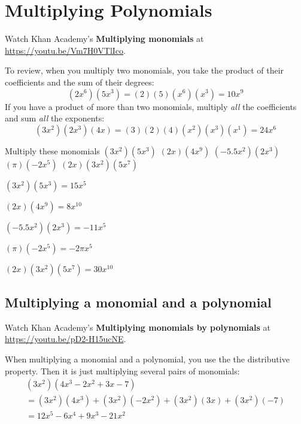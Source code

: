 \chapter{Multiplying Polynomials}

Watch Khan Academy's \textbf{Multiplying monomials} at \url{https://youtu.be/Vm7H0VTlIco}.

To review, when you multiply two monomials, you take the product of
their coefficients and the sum of their degrees:
\begin{equation*}
  (2x^6)(5x^3) = (2)(5)(x^6)(x^3) = 10x^9
\end{equation*}
If you have a product of more than two monomials, multiply \emph{all}
the coefficients and sum \emph{all} the exponents:
\begin{equation*}
  (3x^2)(2x^3)(4x) = (3)(2)(4)(x^2)(x^3)(x^1) = 24x^6
\end{equation*}

\begin{Exercise}[title={Multiplying monomials}, label=multmonomials]
Multiply these monomials
  \Question $(3x^2)(5x^3)$
\vspace{20mm}
  \Question $(2x)(4x^9)$
\vspace{20mm}
  \Question $(-5.5x^2)(2x^3)$
\vspace{20mm}
  \Question $(\pi)(-2x^5)$
\vspace{20mm}
  \Question $(2x)(3x^2)(5x^7)$
\vspace{20mm}
\end{Exercise}
\begin{Answer}[ref=multmonomials]
  $(3x^2)(5x^3) = 15x^5$
  
  $(2x)(4x^9) = 8x^{10}$
  
  $(-5.5x^2)(2x^3) = -11x^5$

  $(\pi)(-2x^5) = -2\pi x^5$
  
  $(2x)(3x^2)(5x^7) = 30x^{10}$
\end{Answer}

\section{Multiplying a monomial and a polynomial}

Watch Khan Academy's \textbf{Multiplying monomials by polynomials} at \url{https://youtu.be/pD2-H15ucNE}.

When multiplying a monomial and a polynomial, you use the the distributive property. Then it is just multiplying several pairs of monomials:
\begin{multline*}
  (3x^2)(4x^3 - 2x^2 + 3x - 7) \\
  = (3x^2)(4x^3) + (3x^2)(-2x^2) + (3x^2)(3x) + (3x^2)(-7) \\
  = 12x^5 - 6x^4 + 9x^3 -21x^2
\end{multline*}


